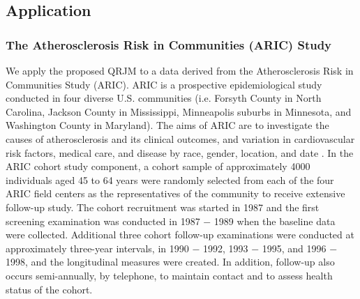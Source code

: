 



% 
\subsection{Application}\label{sec:p2data}
\subsubsection{The Atherosclerosis Risk in Communities (ARIC) Study}\label{sec:p2data_analysis}
We apply the proposed QRJM to a data derived from the Atherosclerosis Risk in Communities Study (ARIC). ARIC is a prospective epidemiological study conducted in four diverse U.S. communities (i.e. Forsyth County in North Carolina, Jackson County in Mississippi, Minneapolis suburbs in Minnesota, and Washington County in Maryland). The aims of ARIC are to investigate the causes of atherosclerosis and its clinical outcomes, and variation in cardiovascular risk factors, medical care, and disease by race, gender, location, and date \citep{aric1989atherosclerosis}. In the ARIC cohort study component, a cohort sample of approximately 4000 individuals aged 45 to 64 years were randomly selected from each of the four ARIC field centers as the representatives of the community to receive extensive follow-up study. The cohort recruitment was started in 1987 and the first screening examination was conducted in 1987 $-$ 1989 when the baseline data were collected. Additional three cohort follow-up examinations were conducted at approximately three-year intervals, in 1990 $-$ 1992, 1993 $-$ 1995, and 1996 $-$ 1998, and the longitudinal measures were created. In addition, follow-up also occurs semi-annually, by telephone, to maintain contact and to assess health status of the cohort.

